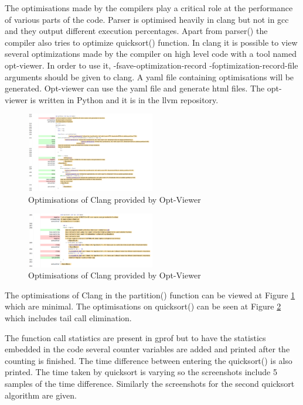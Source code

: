 The optimisations made by the compilers play a critical role at the performance of various parts of the code. Parser is optimised heavily in clang but not in gcc and they output different execution percentages. Apart from parser() the compiler also tries to optimize quicksort() function. In clang it is possible to view several optimizations made by the compiler on high level code with a tool named opt-viewer. In order to use it, -fsave-optimization-record -foptimization-record-file arguments should be given to clang. A yaml file containing optimisations will be generated. Opt-viewer can use the yaml file and generate html files. The opt-viewer is written in Python and it is in the llvm repository.


\begin{figure}[H]
\begin{center}
\leavevmode
\includegraphics[width=0.5\textwidth]{partition_optviewer.png}
\caption{Optimisations of Clang provided by Opt-Viewer}
\label{part_opt}
\end{center}
\end{figure}

\begin{figure}[H]
\begin{center}
\leavevmode
\includegraphics[width=0.5\textwidth]{quicksort_optviewer.png}
\caption{Optimisations of Clang provided by Opt-Viewer}
\label{qs_opt}
\end{center}
\end{figure}
The optimisations of Clang in the partition() function can be viewed at Figure \ref{part_opt} which are minimal. The optimisations on quicksort() can be seen at Figure \ref{qs_opt} which includes tail call elimination. 

The function call statistics are present in gprof but to have the statistics embedded in the code several counter variables are added and printed after the counting is finished. The time difference between entering the quicksort() is also printed. The time taken by quicksort is varying so the screenshots include 5 samples of the time difference. Similarly the screenshots for the second quicksort algorithm are given.


